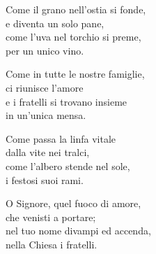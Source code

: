 

\spazio

\strofa Come il grano nell'ostia si fonde,\\
e diventa un solo pane,\\
come l'uva nel torchio si preme,\\
per un unico vino.

\spazio


\spazio

\strofa Come in tutte le nostre famiglie,\\
ci riunisce l'amore\\
e i fratelli si trovano insieme\\
in un'unica mensa.

\spazio


\spazio

\strofa Come passa la linfa vitale\\
dalla vite nei tralci,\\
come l'albero stende nel sole,\\
i festosi suoi rami.

\spazio


\spazio

\strofa O Signore, quel fuoco di amore,\\
che venisti a portare;\\
nel tuo nome divampi ed accenda,\\
nella Chiesa i fratelli.

\spazio

